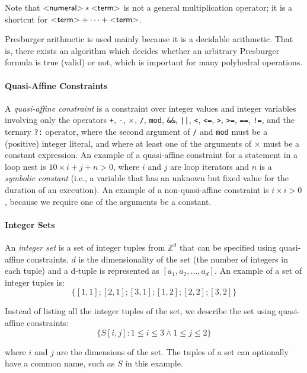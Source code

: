 Note that $\text{\sf\textless numeral\textgreater} * \text{\sf\textless term\textgreater}$ is not a general multiplication operator;
it is a shortcut for $\text{\sf\textless term\textgreater}+\dots+\text{\sf\textless term\textgreater}$.

Presburger arithmetic is used mainly because it is a decidable arithmetic.
That is, there exists an algorithm which decides whether an arbitrary Presburger formula is true (valid) or not, which is important for many polyhedral operations.


\paragraph{Quasi-Affine Constraints}
\label{qaffine}

A \emph{quasi-affine constraint} is a constraint over integer values and integer variables involving only the operators \lstinline{+}, \lstinline{-}, $\times$, \lstinline{/}, \lstinline{mod}, \lstinline{&&}, \lstinline{||}, \lstinline{<}, \lstinline{<=}, \lstinline{>}, \lstinline{>=}, \lstinline{==}, \lstinline{!=}, and the ternary \lstinline{?:} operator, where the second argument of \lstinline{/} and \lstinline{mod} must be a (positive) integer literal, and where at
least one of the arguments of $\times$
must be a constant expression.
An example of a quasi-affine constraint for a statement in a loop nest is $10\times i+j+n>0$, where $i$ and $j$ are loop iterators and $n$ is a
\emph{symbolic constant} (i.e., a variable that has an unknown but fixed value for the duration of
an execution).  An example of a non-quasi-affine constraint is $i \times i>0$, because we require one of the arguments be a constant.

\paragraph{Integer Sets}

An \emph{integer set} is a set of integer tuples from $\mathbb{Z}^d$ that can be specified using  quasi-affine constraints. $d$ is the dimensionality of the set (the number of integers in each tuple) and a d-tuple is represented as $[a_1, a_2, \dots, a_d]$.  An example of a set of integer tuples is:
$$\{[1,1]; [2,1]; [3,1]; [1,2]; [2,2]; [3,2]\}$$

Instead of listing all the integer tuples of the set, we describe the set using quasi-affine constraints:
$$\{S[i,j]:  1 \leq i \leq 3 \wedge 1 \leq j \leq 2\}$$

\noindent where $i$ and $j$ are the dimensions of the set.
The tuples of a set can optionally have a common name, such as
$S$ in this example.

